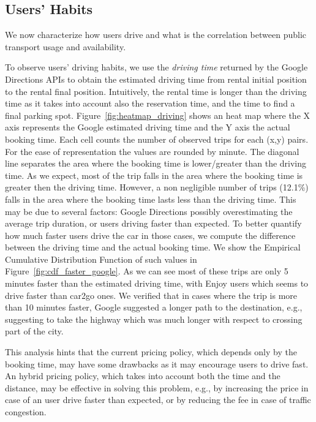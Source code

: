 \subsection{Users' Habits}

We now characterize how users drive and what is the correlation between public transport usage and availability.

To observe users' driving habits, we use the \textit{driving time} returned by the Google Directions APIs to {obtain} the estimated {driving} time from {rental initial position to the rental final position}. Intuitively, the {rental} time is longer than the driving time as it takes into account also the {reservation} time, and the time to find a final parking spot. Figure~\ref{fig:heatmap_driving} shows an heat map where the X axis represents the Google estimated driving time and the Y axis the actual booking time. Each cell counts the number of {observed} trips {for each (x,y) pairs}.
For the ease of representation the values are rounded by minute. The diagonal line separates the area where the booking time is lower/greater than the driving time. As we expect, most of the trip falls in the area where the booking time is greater then the driving time. However, a non negligible number of trips (12.1\%) falls in the area where the booking time lasts less than the driving time. 
This may be due to several factors: Google Directions possibly overestimating the average trip duration, or users driving faster than expected.
To better quantify how much faster users drive the car in those cases, we compute the difference between the driving time and the actual booking time. We show the Empirical Cumulative Distribution Function of such values in Figure~\ref{fig:cdf_faster_google}. As we can see most of these trips are only 5 minutes faster than the estimated driving time, with Enjoy users which seems to drive faster than car2go ones. We verified that in cases where the trip is more than 10 minutes faster, Google suggested a longer path to the destination, e.g., suggesting to take the highway which was much longer with respect to crossing part of the city.

This analysis hints that the current pricing policy, which depends only by the booking time, may have some drawbacks as it may encourage users to drive fast. An hybrid pricing policy, which takes into account both the time and the distance, may be effective in solving this problem, e.g., by increasing the price in case of an user drive faster than expected, or by reducing the fee in case of traffic congestion.

